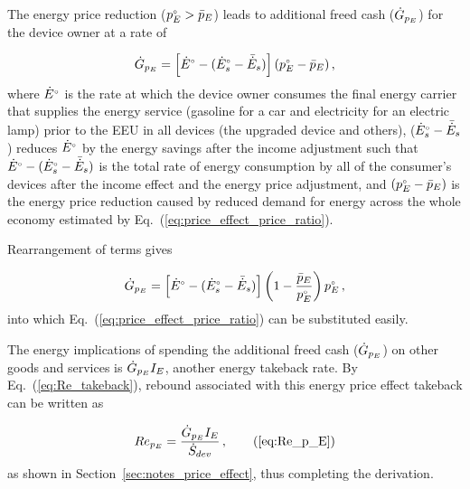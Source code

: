 The energy price reduction (${}{p}^{\scriptscriptstyle \circ}_E > \bar{p}_E$)
leads to additional freed cash ($\dot{G}_{p_E}$) 
for the device owner at a rate of

\begin{equation}
  \dot{G}_{p_E} = \left[ {}{\dot{E}}^{\scriptscriptstyle \circ} - ({}{\dot{E}}^{\scriptscriptstyle \circ}_s - \bar{\dot{E}}_s) \right] ({}{p}^{\scriptscriptstyle \circ}_E - \bar{p}_E) \, ,
\end{equation}
%
where ${}{\dot{E}}^{\scriptscriptstyle \circ}$ is the rate at which the device owner
consumes the final energy carrier that supplies
the energy service
(gasoline for a car and
electricity for an electric lamp) 
prior to the EEU
in all devices (the upgraded device and others), 
(${}{\dot{E}}^{\scriptscriptstyle \circ}_s - \bar{\dot{E}}_s$) reduces 
${}{\dot{E}}^{\scriptscriptstyle \circ}$ by the energy savings after the income adjustment
such that
${}{\dot{E}}^{\scriptscriptstyle \circ} - ({}{\dot{E}}^{\scriptscriptstyle \circ}_s - \bar{\dot{E}}_s)$
is the total rate of energy consumption by all of the 
consumer's devices
after the income effect and the energy price adjustment, and
$({}{p}^{\scriptscriptstyle \circ}_E - \bar{p}_E)$ is the energy price reduction
caused by reduced demand for energy across 
the whole economy estimated by 
Eq.~(\ref{eq:price_effect_price_ratio}). 

Rearrangement of terms gives

\begin{equation}
  \dot{G}_{p_E} = \left[ {}{\dot{E}}^{\scriptscriptstyle \circ} - ({}{\dot{E}}^{\scriptscriptstyle \circ}_s - \bar{\dot{E}}_s) \right] \left( 1 - \frac{\bar{p}_E}{{}{p}^{\scriptscriptstyle \circ}_E} \right) {}{p}^{\scriptscriptstyle \circ}_E \, ,
\end{equation}
%
into which Eq.~(\ref{eq:price_effect_price_ratio})
can be substituted easily.

The energy implications of spending the additional freed cash
($\dot{G}_{p_E}$) on other goods and services is
$\dot{G}_{p_E} I_E$,
another energy takeback rate.
By Eq.~(\ref{eq:Re_takeback}),
rebound associated with this energy price effect takeback
can be written as

\begin{equation}
  Re_{p_E} = \frac{\rate{G}_{p_E} I_E}{\Sdot} \, , \tag{\ref{eq:Re_p_E}}
\end{equation}
%
as shown in Section~\ref{sec:notes_price_effect},
thus completing the derivation.



